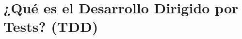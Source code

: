 \section{¿Qué es el Desarrollo Dirigido por Tests? (TDD)} 
\textbf{}\\
\begin{flushleft}


\begin{itemize}



	


\end{itemize} 


\end{flushleft}